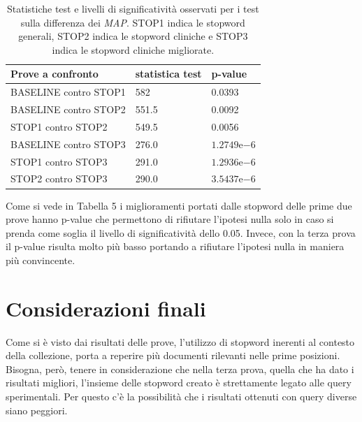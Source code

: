 \documentclass[runningheads]{llncs}
\begin{document}
\begin{table}
\centering
\begin{tabular}{lll}
\hline
\textbf{ Prove a confronto }  & \textbf{ statistica test }  & \textbf{ p-value }            \\ \hline
 BASELINE contro STOP1  &  582      &  0.0393       \\
 BASELINE contro STOP2  &  551.5    &  0.0092       \\
 STOP1 contro STOP2     &  549.5    &  0.0056       \\
 BASELINE contro STOP3  &  276.0    &  $1.2749\mathrm{e}{-6}$   \\
 STOP1 contro STOP3     &  291.0    &  $1.2936\mathrm{e}{-6}$   \\
 STOP2 contro STOP3     &  290.0    &  $3.5437\mathrm{e}{-6}$   \\ \hline
\end{tabular}

\caption{ Statistiche test e livelli di significativit\`a osservati per i test sulla differenza dei \textit{MAP}.
STOP1 indica le stopword generali, STOP2 indica le stopword cliniche e STOP3 indica le stopword cliniche migliorate.}
\vspace{-5mm}
\end{table}

Come si vede in Tabella 5 i miglioramenti portati dalle stopword delle prime due prove hanno p-value che permettono di rifiutare l'ipotesi nulla solo in caso si prenda come soglia il livello di significativit\`a dello 0.05.
Invece, con la terza prova il p-value risulta molto pi\`u basso portando a rifiutare l'ipotesi nulla in maniera pi\`u convincente.


\section{Considerazioni finali}

Come si \`e visto dai risultati delle prove, l'utilizzo di stopword inerenti al contesto
della collezione, porta a reperire pi\`u documenti rilevanti nelle prime posizioni.
Bisogna, per\`o, tenere in considerazione che nella terza prova, quella che ha dato
i risultati migliori, l'insieme delle stopword creato \`e strettamente legato alle
query sperimentali. Per questo c'\`e la possibilit\`a che i risultati ottenuti con query diverse
siano peggiori.
\end{document}
